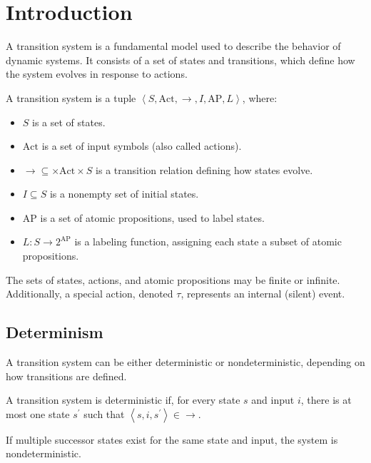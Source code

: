 \section{Introduction}

A transition system is a fundamental model used to describe the behavior of dynamic systems. 
It consists of a set of states and transitions, which define how the system evolves in response to actions.
\begin{definition}
    A transition system is a tuple $\left\langle S, \text{Act}, \rightarrow, I,\text{AP}, L\right\rangle$, where:
    \begin{itemize}
        \item $S$ is a set of states.
        \item $\text{Act}$ is a set of input symbols (also called actions).
        \item $\rightarrow \subseteq \times \text{Act}\times S$ is a transition relation defining how states evolve.
        \item $I \subseteq S$ is a nonempty set of initial states.
        \item $\text{AP}$ is a set of atomic propositions, used to label states.
        \item $L: S \rightarrow 2^{\text{AP}}$ is a labeling function, assigning each state a subset of atomic propositions.
    \end{itemize}
\end{definition}
The sets of states, actions, and atomic propositions may be finite or infinite. 
Additionally, a special action, denoted $\tau$, represents an internal (silent) event.

\subsection{Determinism}
A transition system can be either deterministic or nondeterministic, depending on how transitions are defined.
\begin{definition}
    A transition system is deterministic if, for every state $s$ and input $i$, there is at most one state $s^\prime$ such that $\left\langle s, i, s^\prime\right\rangle \in\rightarrow$. 
\end{definition}
If multiple successor states exist for the same state and input, the system is nondeterministic.

